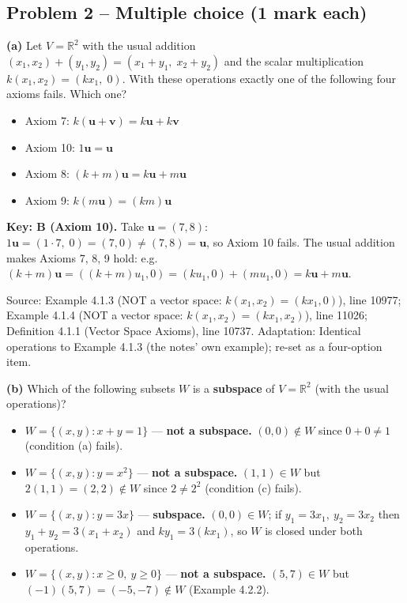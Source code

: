 \documentclass[11pt,a4paper]{article}
\newcommand{\Src}[1]{{\footnotesize\color{black!65}Source: #1}}
\begin{document}
\subsection*{Problem 2 -- Multiple choice (1 mark each)}
\textbf{(a)} Let $V=\mathbb{R}^2$ with the usual addition $(x_1,x_2)+(y_1,y_2)=(x_1+y_1,\;x_2+y_2)$ and the scalar multiplication $k(x_1,x_2)=(kx_1,\;0)$. With these operations exactly one of the following four axioms fails. Which one?\par
\begin{itemize}[leftmargin=8mm,itemsep=0pt]\item[A] Axiom 7: $k(\mathbf{u}+\mathbf{v})=k\mathbf{u}+k\mathbf{v}$\item[B$^{\ast}$] Axiom 10: $1\mathbf{u}=\mathbf{u}$\item[C] Axiom 8: $(k+m)\mathbf{u}=k\mathbf{u}+m\mathbf{u}$\item[D] Axiom 9: $k(m\mathbf{u})=(km)\mathbf{u}$\end{itemize}
\textbf{Key: B (Axiom 10).} Take $\mathbf{u}=(7,8)$: $1\mathbf{u}=(1\cdot7,\;0)=(7,0)\neq(7,8)=\mathbf{u}$, so Axiom 10 fails. The usual addition makes Axioms 7, 8, 9 hold: e.g. $(k+m)\mathbf{u}=((k+m)u_1,0)=(ku_1,0)+(mu_1,0)=k\mathbf{u}+m\mathbf{u}$.\par
\Src{Example 4.1.3 (NOT a vector space: $k(x_1,x_2)=(kx_1,0)$), line 10977; Example 4.1.4 (NOT a vector space: $k(x_1,x_2)=(kx_1,x_2)$), line 11026; Definition 4.1.1 (Vector Space Axioms), line 10737. Adaptation: Identical operations to Example 4.1.3 (the notes' own example); re-set as a four-option item.}\par
{}\textbf{(b)} Which of the following subsets $W$ is a \textbf{subspace} of $V=\mathbb{R}^2$ (with the usual operations)?\par
\begin{itemize}[leftmargin=8mm,itemsep=0pt]\item[A] $W=\{(x,y) : x+y=1\}$ --- \textbf{not a subspace.} $(0,0)\notin W$ since $0+0\neq1$ (condition (a) fails).\item[B] $W=\{(x,y) : y=x^2\}$ --- \textbf{not a subspace.} $(1,1)\in W$ but $2(1,1)=(2,2)\notin W$ since $2\neq2^2$ (condition (c) fails).\item[C$^{\ast}$] $W=\{(x,y) : y=3x\}$ --- \textbf{subspace.} $(0,0)\in W$; if $y_1=3x_1,\ y_2=3x_2$ then $y_1+y_2=3(x_1+x_2)$ and $ky_1=3(kx_1)$, so $W$ is closed under both operations.\item[D] $W=\{(x,y) : x\ge0,\ y\ge0\}$ --- \textbf{not a subspace.} $(5,7)\in W$ but $(-1)(5,7)=(-5,-7)\notin W$ (Example 4.2.2).\end{itemize}
\end{document}
